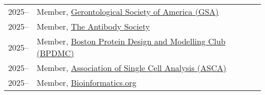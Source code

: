 \begin{longtable}[l]{@{}p{} p{}}

    2025-- & Member, \href{https://www.geron.org}{Gerontological Society of America (GSA)} \\

    2025-- & Member, \href{https://www.antibodysociety.org/}{The Antibody Society} \\

    2025-- & Member, \href{https://www.bpdmc.org/}{Boston Protein Design and Modelling Club (BPDMC)} \\

    2025-- & Member, \href{https://ascanet.org/}{Association of Single Cell Analysis (ASCA)} \\

    2025-- & Member, \href{https://www.bioinformatics.org/}{Bioinformatics.org} \\

\end{longtable}
